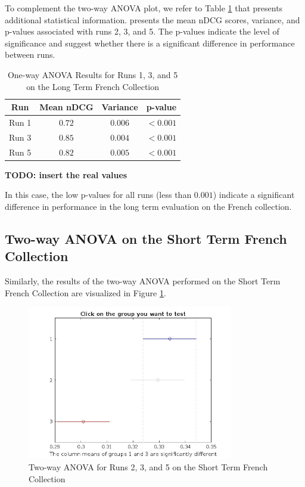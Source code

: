 To complement the two-way \ac{ANOVA} plot, we refer to Table \ref{table:lt_anova_french} that presents additional statistical information.
presents the mean \ac{nDCG} scores, variance, and p-values associated with runs 2, 3, and 5. 
The p-values indicate the level of significance and suggest whether there is a significant difference in performance between runs.

\begin{table}[!h]
\centering
\caption{One-way \ac{ANOVA} Results for Runs 1, 3, and 5 on the Long Term French Collection}
\label{table:lt_anova_french}
\begin{tabular}{cccc}
\toprule
\textbf{Run} & \textbf{Mean nDCG} & \textbf{Variance} & \textbf{p-value} \\
\midrule
Run 1 & $0.72$ & $0.006$ & $<0.001$ \\
Run 3 & $0.85$ & $0.004$ & $<0.001$ \\
Run 5 & $0.82$ & $0.005$ & $<0.001$ \\
\bottomrule
\end{tabular}
\end{table}

\begin{center}
    \textbf{TODO: insert the real values}
\end{center}
 
In this case, the low p-values for all runs (less than $0.001$) indicate a significant difference in performance in the long term evaluation on the French collection.

\newpage
\subsection{Two-way ANOVA on the Short Term French Collection}

Similarly, the results of the two-way \ac{ANOVA} performed on the Short Term French Collection are visualized in Figure \ref{fig:st_anova_french}. 

\begin{figure}[!h]
\centering
\includegraphics[width=0.8\textwidth]{figure/StatisticalAnalysis/AnovaTwoWay/ST_FR.jpg}
\caption{Two-way \ac{ANOVA} for Runs 2, 3, and 5 on the Short Term French Collection}
\label{fig:st_anova_french}
\end{figure}

